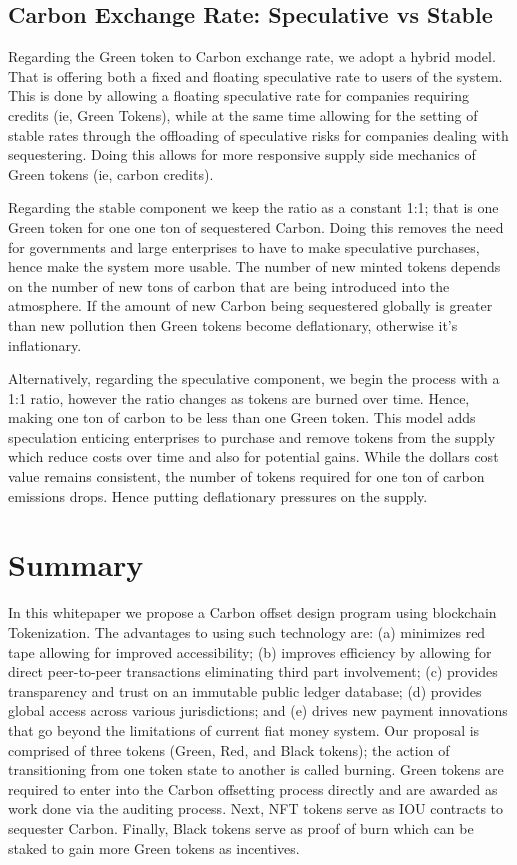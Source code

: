 \documentclass{article}
\begin{document}
\subsection{Carbon Exchange Rate: Speculative vs Stable}

Regarding the Green token to Carbon exchange rate, we adopt a hybrid model. That is offering both a fixed and floating speculative rate to users of the system. This is done by allowing a floating speculative rate for companies requiring credits (ie, Green Tokens), while at the same time allowing for the setting of stable rates through the offloading of speculative risks for companies dealing with sequestering. Doing this allows for more responsive supply side mechanics of Green tokens (ie, carbon credits).

Regarding the stable component we keep the ratio as a constant 1:1; that is one Green token for one one ton of sequestered Carbon. Doing this removes the need for governments and large enterprises to have to make speculative purchases, hence make the system more usable. The number of new minted tokens depends on the number of new tons of carbon that are being introduced into the atmosphere. If the amount of new Carbon being sequestered globally is greater than new pollution then Green tokens become deflationary, otherwise it's inflationary.

Alternatively, regarding the speculative component, we begin the process with a 1:1 ratio, however the ratio changes as tokens are burned over time. Hence, making one ton of carbon to be less than one Green token. This model adds speculation enticing enterprises to purchase and remove tokens from the supply which reduce costs over time and also for potential gains. While the dollars cost value remains consistent, the number of tokens required for one ton of carbon emissions drops. Hence putting deflationary pressures on the supply.

\section{Summary}

In this whitepaper we propose a Carbon offset design program using blockchain Tokenization. The advantages to using such technology are: (a) minimizes red tape allowing for improved accessibility; (b) improves efficiency by allowing for direct peer-to-peer transactions eliminating third part involvement; (c) provides transparency and trust on an immutable public ledger database; (d) provides global access across various jurisdictions; and (e) drives new payment innovations that go beyond the limitations of current fiat money system. Our proposal is comprised of three tokens (Green, Red, and Black tokens); the action of transitioning from one token state to another is called burning. Green tokens are required to enter into the Carbon offsetting process directly and are awarded as work done via the auditing process. Next, NFT tokens serve as IOU contracts to sequester Carbon. Finally, Black tokens serve as proof of burn which can be staked to gain more Green tokens as incentives.  
\end{document}
